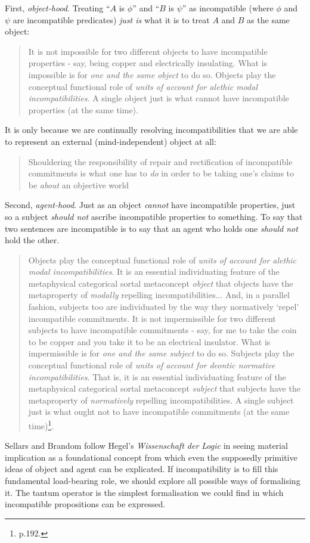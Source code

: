 First, \emph{object-hood}.
Treating ``$A$ is $\phi$'' and ``$B$ is $\psi$'' as incompatible (where $\phi$ and $\psi$ are incompatible predicates) \emph{just is} what it is to treat $A$ and $B$ as the same object:
\begin{quote}
It is not impossible for two different objects to have incompatible properties - say, being copper and electrically insulating. What is impossible is for \emph{one and the same object} to do so. 
Objects play the conceptual functional role of \emph{units of account for alethic modal incompatibilities}. 
A single object just is what cannot have incompatible properties (at the same time).
\end{quote}
It is only because we are continually resolving incompatibilities that we are able to represent an external (mind-independent) object at all:
\begin{quote}
Shouldering the responsibility of repair and rectification of incompatible commitments is what one has to \emph{do} in order to be taking one's claims to be \emph{about} an objective world
\end{quote}
Second, \emph{agent-hood}.
Just as an object \emph{cannot} have incompatible properties, just so a subject \emph{should not} ascribe incompatible properties to something.
To say that two sentences are incompatible is to say that an agent who holds one \emph{should not} hold the other.
\begin{quote}
Objects play the conceptual functional role of \emph{units of account for alethic modal incompatibilities}. 
It is an essential individuating feature of the metaphysical categorical sortal metaconcept \emph{object} that objects have the metaproperty of \emph{modally} repelling incompatibilities...
And, in a parallel fashion, subjects too are individuated by the way they normatively `repel' incompatible commitments.
It is not impermissible for two different subjects to have incompatible commitments - say, for me to take the coin to be copper and you take it to be an electrical insulator. What is impermissible is for \emph{one and the same subject} to do so. Subjects play the conceptual functional role of \emph{units of account for deontic normative incompatibilities}. 
That is, it is an essential individuating feature of the metaphysical categorical sortal metaconcept \emph{subject} that subjects have the metaproperty of \emph{normatively} repelling incompatibilities. A single subject just is what ought not to have incompatible commitments (at the same time)\footnote{\cite{brandom} p.192.}.
\end{quote}
Sellars and Brandom follow Hegel's  \emph{Wissenschaft der Logic} \cite{HegelGWF:wisdlog} in seeing material implication as a foundational concept from which even the supposedly primitive ideas of object and agent can be explicated.
If incompatibility is to fill this fundamental load-bearing role, we should explore all possible ways of formalising it. 
The tantum operator is the simplest formalisation we could find in which incompatible propositions can be expressed.

